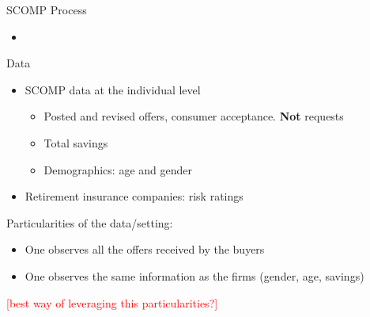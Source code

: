 \documentclass[10pt,aspectratio=169]{beamer}
\begin{document}
\begin{frame}{SCOMP Process}\label{slide:setting2}
\begin{center}

\end{center}
\begin{itemize}
    \item \hyperlink{slide:fig_offer_certificate}{}
\end{itemize}
\end{frame}

\begin{frame}{Data} \label{slide:data}
\begin{itemize}
    \item SCOMP data at the individual level  
    \begin{itemize}
        \item Posted and revised offers, consumer acceptance. \textbf{Not} requests 
        \item Total savings 
        \item Demographics: age and gender \hyperlink{slide:fig_offer_certificate}{}
    \end{itemize}
     \item Retirement insurance companies: risk ratings
\end{itemize}

Particularities of the data/setting: 
\begin{itemize}
    \item One observes all the offers received by the buyers 
    \item One observes the same information as the firms (gender, age, savings)
\end{itemize}
\textcolor{red}{[best way of leveraging this particularities?]}
\end{frame}
\end{document}
